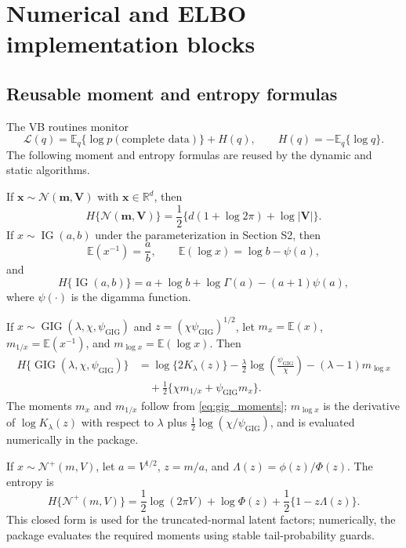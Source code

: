 \documentclass[nojss,noheadings]{jss}
\newcommand{\R}{\mathbb{R}}
\renewcommand{\E}{\mathbb{E}}
\newcommand{\vect}[1]{\bm{#1}}
\newcommand{\mat}[1]{\mathbf{#1}}
\newcommand{\N}{\mathcal{N}}
\newcommand{\TNp}{\mathcal{N}^{+}}
\newcommand{\IG}{\operatorname{IG}}
\newcommand{\GIG}{\operatorname{GIG}}
\newcommand{\elbo}{\mathcal{L}}
\begin{document}
\section{Numerical and ELBO implementation blocks}
\label{sec:numerical_blocks}

\subsection{Reusable moment and entropy formulas}
\label{sec:elbo_building_blocks}

The VB routines monitor
\begin{equation}
\elbo(q)=\E_q\{\log p(\text{complete data})\}+H(q),
\qquad
H(q)=-\E_q\{\log q\}.
\end{equation}
The following moment and entropy formulas are reused by the dynamic and static
algorithms.

If $\vect{x}\sim\N(\vect{m},\mat{V})$ with
$\vect{x}\in\R^d$, then
\begin{equation}
H\{\N(\vect{m},\mat{V})\}
=\frac{1}{2}\{d(1+\log 2\pi)+\log|\mat{V}|\}.
\label{eq:entropy_gaussian}
\end{equation}
If $x\sim\IG(a,b)$ under the parameterization in Section S2, then
\begin{equation}
\E(x^{-1})=\frac{a}{b},\qquad
\E(\log x)=\log b-\psi(a),
\end{equation}
and
\begin{equation}
H\{\IG(a,b)\}
=a+\log b+\log\Gamma(a)-(a+1)\psi(a),
\label{eq:entropy_ig}
\end{equation}
where $\psi(\cdot)$ is the digamma function.

If $x\sim\GIG(\lambda,\chi,\psi_{\mathrm{GIG}})$ and
$z=(\chi\psi_{\mathrm{GIG}})^{1/2}$, let
$m_x=\E(x)$, $m_{1/x}=\E(x^{-1})$, and
$m_{\log x}=\E(\log x)$. Then
\begin{align}
H\{\GIG(\lambda,\chi,\psi_{\mathrm{GIG}})\}
&=
\log\{2K_\lambda(z)\}
-\frac{\lambda}{2}\log\left(\frac{\psi_{\mathrm{GIG}}}{\chi}\right)
-(\lambda-1)m_{\log x} \nonumber\\
&\quad+
\frac{1}{2}\{\chi m_{1/x}+\psi_{\mathrm{GIG}} m_x\}.
\label{eq:entropy_gig}
\end{align}
The moments $m_x$ and $m_{1/x}$ follow from \eqref{eq:gig_moments};
$m_{\log x}$ is the derivative of $\log K_\lambda(z)$ with respect to
$\lambda$ plus $\frac{1}{2}\log(\chi/\psi_{\mathrm{GIG}})$, and is evaluated
numerically in the package.

If $x\sim\TNp(m,V)$, let $a=V^{1/2}$, $z=m/a$, and
$\Lambda(z)=\phi(z)/\Phi(z)$. The entropy is
\begin{equation}
H\{\TNp(m,V)\}
=
\frac{1}{2}\log(2\pi V)+\log\Phi(z)
+\frac{1}{2}\{1-z\Lambda(z)\}.
\label{eq:entropy_tnp}
\end{equation}
This closed form is used for the truncated-normal latent factors; numerically,
the package evaluates the required moments using stable tail-probability
guards.
\end{document}
